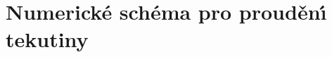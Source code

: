         
    \section{Numerick\'{e} sch\'{e}ma pro proud\v{e}n\'{\i} tekutiny}
    \label{sec:NumSchFluFlo}
            
